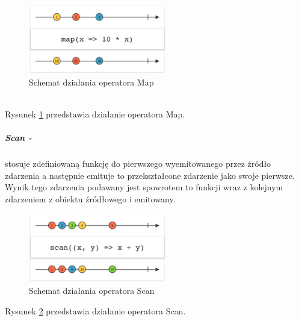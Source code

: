 \documentclass[12pt,oneside,a4paper]{report}
\begin{document}
\begin{figure}[ht!]
	\centering
	\includegraphics[width=6cm]{map}
	\caption{Schemat działania operatora Map\cite{marbles}}
	\label{map}
\end{figure}\\
Rysunek \ref{map} przedstawia działanie operatora Map.
\subparagraph{Scan -}stosuje zdefiniowaną funkcję do pierwszego wyemitowanego przez źródło zdarzenia a następnie emituje to przekształcone zdarzenie jako swoje pierwsze. Wynik tego zdarzenia podawany jest spowrotem to funkcji wraz z kolejnym zdarzeniem z obiektu źródłowego i emitowany.
\begin{figure}[ht!]
	\centering
	\includegraphics[width=6cm]{scan}
	\caption{Schemat działania operatora Scan\cite{marbles}}
	\label{scan}
\end{figure}
Rysunek \ref{scan} przedstawia działanie operatora Scan.
\pagebreak
\end{document}
